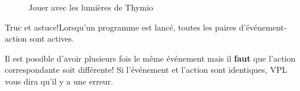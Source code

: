 \begin{figure}[h]
    \centering
    \hspace{1cm}
    \caption{Jouer avec les lumières de Thymio}
    \label{fig.colors}
\end{figure}

\begin{bclogo}[couleur = blue!30, arrondi = 0.1, logo = \bcinfo, ombre = true]{Truc et astuce!}Lorsqu'un programme est lancé, toutes les paires d'événement-action sont actives.

Il est possible d'avoir plusieurs fois le même événement mais il \textbf{faut} que l'action correspondante soit différente! Si l'événement et l'action sont identiques, VPL vous dira qu'il y a une erreur.
\end{bclogo}




